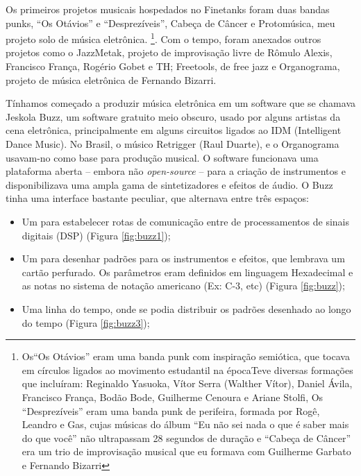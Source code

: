    
Os primeiros projetos musicais hospedados no Finetanks foram duas bandas punks, ``Os Otávios'' e ``Desprezíveis'', Cabeça de Câncer e Protomúsica, meu projeto solo de música eletrônica. \footnote{Os``Os Otávios'' eram uma banda punk com inspiração semiótica, que tocava em círculos ligados ao movimento estudantil na épocaTeve diversas formações que incluíram: Reginaldo Yasuoka, Vítor Serra (Walther Vítor), Daniel Ávila, Francisco França, Bodão Bode, Guilherme Cenoura e Ariane Stolfi, Os ``Desprezíveis'' eram uma banda punk de perifeira, formada por Rogê, Leandro e Gas, cujas músicas do álbum ``Eu não sei nada o que é saber mais do que você'' não ultrapassam 28 segundos de duração e ``Cabeça de Câncer'' era um trio de improvisação musical que eu formava com Guilherme Garbato e Fernando Bizarri}. Com o tempo, foram anexados outros projetos como o JazzMetak, projeto de improvisação livre de Rômulo Alexis, Francisco França, Rogério Gobet e TH; Freetools, de free jazz e Organograma, projeto de música eletrônica de Fernando Bizarri.

Tínhamos começado a produzir música eletrônica em um software que se chamava Jeskola Buzz, um software gratuito meio obscuro, usado por alguns artistas da cena eletrônica, principalmente em alguns circuitos ligados ao IDM (Intelligent Dance Music). No Brasil, o músico Retrigger (Raul Duarte), e o Organograma usavam-no como base para produção musical. O software funcionava uma plataforma aberta -- embora não \emph{open-source} -- para a criação de instrumentos e disponibilizava uma ampla gama de sintetizadores e efeitos de áudio. O Buzz tinha uma interface bastante peculiar, que alternava entre três espaços:

\begin{itemize}
\item Um para estabelecer rotas de comunicação entre de processamentos de sinais digitais (DSP) (Figura \ref{fig:buzz1});
\item Um para desenhar padrões para os instrumentos e efeitos, que lembrava um cartão perfurado. Os parâmetros eram definidos em linguagem Hexadecimal e as notas no sistema de notação americano (Ex: C-3, etc) (Figura \ref{fig:buzz});
\item Uma linha do tempo, onde se podia distribuir os padrões desenhado ao longo do tempo (Figura \ref{fig:buzz3});
\end{itemize}


